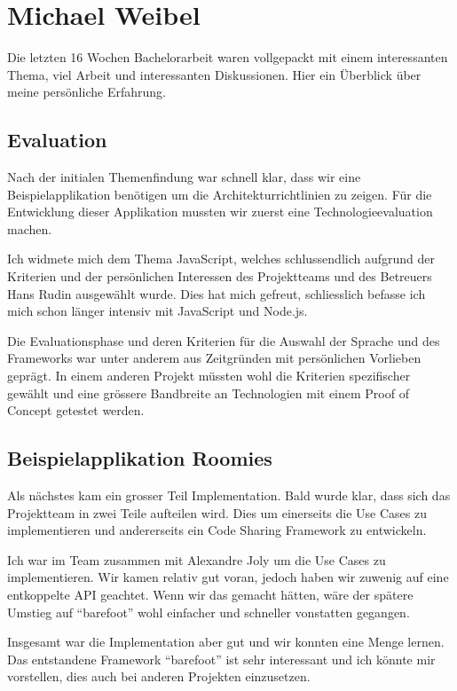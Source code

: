 \section{Michael Weibel}

Die letzten 16 Wochen Bachelorarbeit waren vollgepackt mit einem interessanten Thema, viel Arbeit und interessanten Diskussionen. Hier ein Überblick über meine persönliche Erfahrung.

\subsection*{Evaluation}
Nach der initialen Themenfindung war schnell klar, dass wir eine Beispielapplikation benötigen um die Architekturrichtlinien zu zeigen. Für die Entwicklung dieser Applikation mussten wir zuerst eine Technologieevaluation machen.

Ich widmete mich dem Thema JavaScript, welches schlussendlich aufgrund der Kriterien und der persönlichen Interessen des Projektteams und des Betreuers Hans Rudin ausgewählt wurde. Dies hat mich gefreut, schliesslich befasse ich mich schon länger intensiv mit JavaScript und Node.js.

Die Evaluationsphase und deren Kriterien für die Auswahl der Sprache und des Frameworks war unter anderem aus Zeitgründen mit persönlichen Vorlieben geprägt. In einem anderen Projekt müssten wohl die Kriterien spezifischer gewählt und eine grössere Bandbreite an Technologien mit einem Proof of Concept getestet werden.

\subsection*{Beispielapplikation Roomies}
Als nächstes kam ein grosser Teil Implementation. Bald wurde klar, dass sich das Projektteam in zwei Teile aufteilen wird. Dies um einerseits die Use Cases zu implementieren und andererseits ein Code Sharing Framework zu entwickeln.

Ich war im Team zusammen mit Alexandre Joly um die Use Cases zu implementieren. Wir kamen relativ gut voran, jedoch haben wir zuwenig auf eine entkoppelte API geachtet. Wenn wir das gemacht hätten, wäre der spätere Umstieg auf ``barefoot'' wohl einfacher und schneller vonstatten gegangen.

Insgesamt war die Implementation aber gut und wir konnten eine Menge lernen. Das entstandene Framework ``barefoot'' ist sehr interessant und ich könnte mir vorstellen, dies auch bei anderen Projekten einzusetzen.

